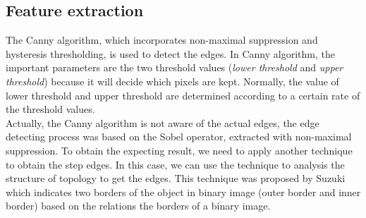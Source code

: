 \subsection{Feature extraction}
The Canny\cite{canny1986computational} algorithm, which incorporates non-maximal suppression and hysteresis thresholding, is used to detect the edges. In Canny algorithm, the important parameters are the two threshold values (\textit{lower threshold} and \textit{upper threshold}) because it will decide which pixels are kept. Normally, the value of lower threshold and upper threshold are determined according to a certain rate of the threshold values. \\
Actually, the Canny algorithm is not aware of the actual edges, the edge detecting process was based on the Sobel operator, extracted with non-maximal suppression. To obtain the expecting result, we need to apply another technique to obtain the step edges. In this case, we can use the technique to analysis the structure of topology to get the edges. This technique was proposed by Suzuki\cite{suzuki1985topological} which indicates two borders of the object in binary image (outer border and inner border) based on the relations the borders of a binary image. 
